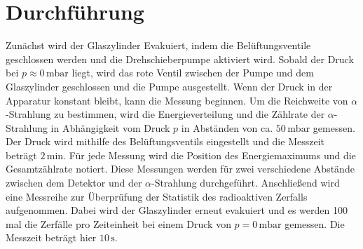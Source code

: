 \section{Durchführung}
\label{sec:Durchführung}
Zunächst wird der Glaszylinder Evakuiert, indem die Belüftungsventile geschlossen werden und die Drehschieberpumpe aktiviert 
wird. Sobald der Druck bei $p \approx 0\,\unit{\milli\bar}$ liegt, wird das rote Ventil zwischen der Pumpe und dem Glaszylinder 
geschlossen und die Pumpe ausgestellt. Wenn der Druck in der Apparatur konstant bleibt, kann die Messung beginnen. Um die Reichweite 
von $\alpha$-Strahlung zu bestimmen, wird die Energieverteilung und die Zählrate der $\alpha$-Strahlung in Abhängigkeit vom Druck $p$ 
in Abständen von ca. $50\,\unit{\milli\bar}$ gemessen. Der Druck wird mithilfe des Belüftungsventils eingestellt und die Messzeit beträgt $2\,\unit{\minute}$. 
Für jede Messung wird die Position des Energiemaximums und die Gesamtzählrate notiert. 
Diese Messungen werden für zwei verschiedene Abstände zwischen dem Detektor und der $\alpha$-Strahlung durchgeführt. Anschließend wird 
eine Messreihe zur Überprüfung der Statistik des radioaktiven Zerfalls aufgenommen. Dabei wird der Glaszylinder erneut evakuiert und es 
werden 100 mal die Zerfälle pro Zeiteinheit bei einem Druck von $p = 0\,\unit{\milli\bar}$ gemessen. Die Messzeit beträgt hier $10\,\unit{\second}$.
